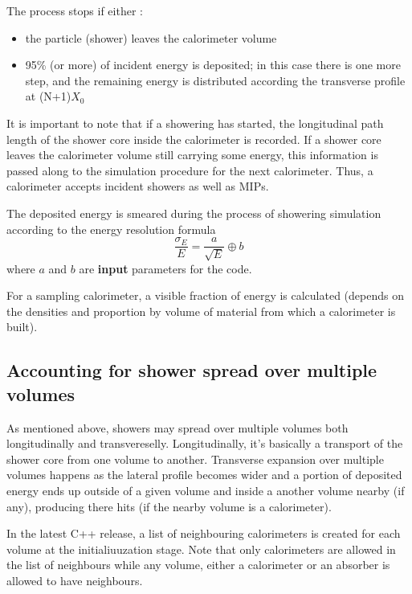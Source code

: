 The process stops if either :
\begin{itemize}
\item {the particle (shower) leaves the calorimeter volume}
\item {95\% (or more) of incident energy is deposited; in this case 
there is one more step, and the remaining energy is distributed according
the transverse profile at (N+1)$X_0$}
\end{itemize}

It is important to note that if a showering has started, the longitudinal path
length of the shower core inside the calorimeter is recorded.   If a shower core
leaves the calorimeter volume still carrying some energy, this information is
passed along to the simulation procedure for the next calorimeter.  Thus,  a
calorimeter accepts incident showers as well as MIPs. 

The deposited energy is smeared during the process of showering simulation according 
to the energy resolution formula
\begin{displaymath}
\frac{\sigma_E}{E} = \frac{a}{\surd E} \oplus b
\end{displaymath}
where {\large $a$} and {\large $b$} are {\bf input} parameters for the code.

For a sampling calorimeter, a visible fraction of energy is calculated (depends
on the densities and proportion by volume of material from which a calorimeter is built).

\bigskip

\subsection{Accounting for shower spread over multiple volumes}

As mentioned above, showers may spread over multiple volumes both longitudinally
and transvereselly. Longitudinally, it's basically a transport of the shower core 
from one volume to another. Transverse expansion over multiple volumes happens as
the lateral profile becomes wider and a portion of deposited energy ends up outside
of a given volume and inside a another volume nearby (if any), producing there hits
(if the nearby volume is a calorimeter).

In the latest C++ release, a list of neighbouring calorimeters is created for each
volume at the initialiuuzation stage. Note that only calorimeters are allowed in 
the list of neighbours while any volume, either a calorimeter or an absorber is
allowed to have neighbours.

